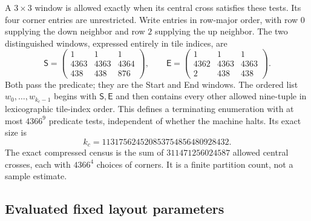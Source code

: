 A $3\times3$ window is allowed exactly when its central cross satisfies
these tests. Its four corner entries are unrestricted. Write entries in
row-major order, with row $0$ supplying the down neighbor and row $2$
supplying the up neighbor. The two distinguished windows, expressed
entirely in tile indices, are
\[
 \mathsf S=
 \begin{pmatrix}
 1&1&1\\4363&4363&4364\\438&438&876
 \end{pmatrix},\qquad
 \mathsf E=
 \begin{pmatrix}
 1&1&1\\4362&4363&4363\\2&438&438
 \end{pmatrix}.
\]
Both pass the predicate; they are the Start and End windows. The ordered
list $w_0,\ldots,w_{k_c-1}$ begins with $\mathsf S,\mathsf E$ and then
contains every other allowed nine-tuple in lexicographic tile-index order.
This defines a terminating enumeration with at most $4366^9$ predicate
tests, independent of whether the machine halts. Its exact size is
\begin{equation}\label{app:window-count}
 k_c=113175624520853754856480928432.
\end{equation}
The exact compressed census is the sum of
$311471256024587$ allowed central crosses, each with $4366^4$ choices
of corners. It is a finite partition count, not a sample estimate.

\subsection{Evaluated fixed layout parameters}

